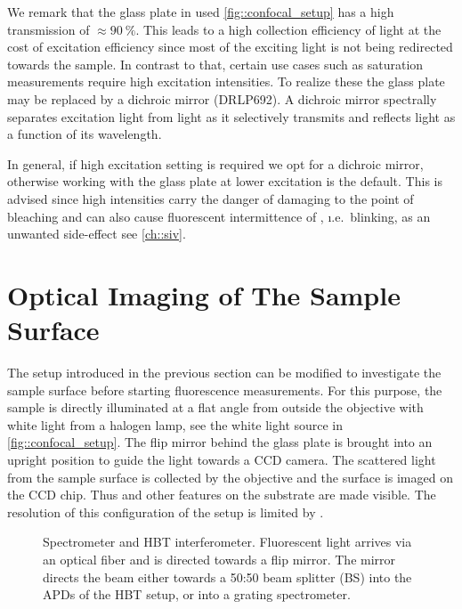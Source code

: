 		We remark that the glass plate in used \autoref{fig::confocal_setup} has a high transmission of $\approx \SI{90}{\percent}$. This leads to a high collection efficiency of \fl light at the cost of excitation efficiency since most of the exciting light is not being redirected towards the sample. In contrast to that, certain use cases such as saturation measurements require high excitation intensities. To realize these the glass plate may be replaced by a dichroic mirror (DRLP692). A dichroic mirror spectrally separates excitation light from \pl light as it selectively transmits and reflects light as a function of its wavelength.

		In general, if high excitation setting is required we opt for a dichroic mirror, otherwise working with the glass plate at lower excitation is the default. This is advised since high intensities carry the danger of damaging \sivs to the point of bleaching and can also cause fluorescent intermittence of \sivs, \i.e.\ blinking, as an unwanted side-effect see \autoref{ch::siv}.

	\section[Surface Imaging]{Optical Imaging of The Sample Surface} \label{sec::methods_optical}

		The setup introduced in the previous section can be modified to investigate the sample surface before starting fluorescence measurements.
		For this purpose, the sample is directly illuminated at a flat angle from outside the objective with white light from a halogen lamp, see the white light source in \autoref{fig::confocal_setup}.
		The flip mirror behind the glass plate is brought into an upright position to guide the light towards a CCD camera.
		The scattered light from the sample surface is collected by the objective and the surface is imaged on the CCD chip.
		Thus \nds and other features on the substrate are made visible.
		The resolution of this configuration of the setup is limited by .

		\begin{figure}[htb]
			\centering
			\caption[Spectrometer and HBT setup]{Spectrometer and HBT interferometer. Fluorescent light arrives via an optical fiber and is directed towards a flip mirror. The mirror directs the beam either towards a 50:50 beam splitter (BS) into the APDs of the HBT setup, or into a grating spectrometer.}
			\label{fig::hbt_spectrometer}
		\end{figure}

